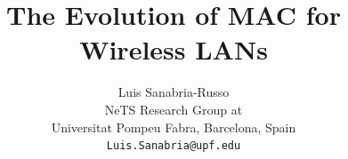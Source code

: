 \documentclass[a4paper,journal]{IEEEtran}
\begin{document}
 \title{The Evolution of MAC for Wireless LANs}



\author{Luis Sanabria-Russo \\
		NeTS Research Group at\\
		Universitat Pompeu Fabra, Barcelona, Spain\\
		\texttt{Luis.Sanabria@upf.edu}}



\maketitle
\end{document}
